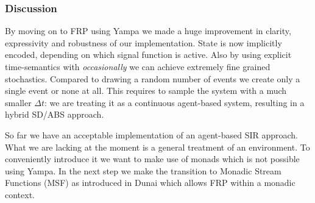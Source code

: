 \subsubsection{Discussion}
By moving on to FRP using Yampa we made a huge improvement in clarity, expressivity and robustness of our implementation. State is now implicitly encoded, depending on which signal function is active. Also by using explicit time-semantics with \textit{occasionally} we can achieve extremely fine grained stochastics. Compared to drawing a random number of events we create only a single event or none at all. This requires to sample the system with a much smaller $\Delta t$: we are treating it as a  continuous agent-based system, resulting in a hybrid SD/ABS approach.

So far we have an acceptable implementation of an agent-based SIR approach. What we are lacking at the moment is a general treatment of an environment. To conveniently introduce it we want to make use of monads which is not possible using Yampa. In the next step we make the transition to Monadic Stream Functions (MSF) as introduced in Dunai \cite{perez_functional_2016} which allows FRP within a monadic context.
